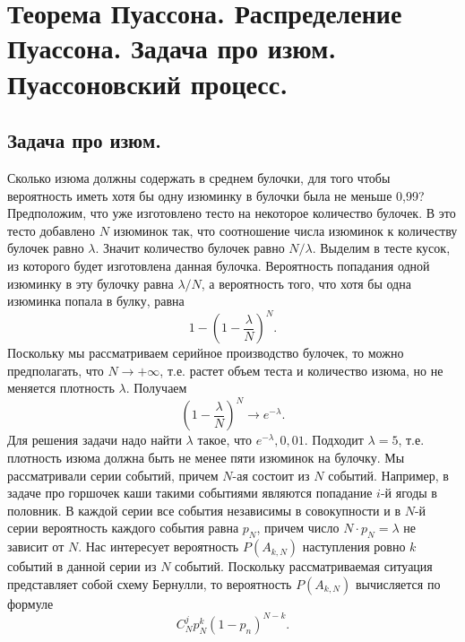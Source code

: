 \section{Теорема Пуассона. Распределение Пуассона. Задача про изюм. Пуассоновский процесс.}

\subsection{Задача про изюм.}
Сколько изюма должны содержать в среднем булочки, для того чтобы вероятность иметь хотя бы одну изюминку в булочки была не меньше 0,99?
\newline
Предположим, что уже изготовлено тесто на некоторое количество булочек. В это тесто добавлено $N$ изюминок так, что соотношение числа изюминок к количеству булочек равно $\lambda$. Значит количество булочек равно $N/\lambda$.
\newline
Выделим в тесте кусок, из которого будет изготовлена данная булочка. Вероятность попадания одной изюминку в эту булочку равна $\lambda / N$, а вероятность того, что хотя бы одна изюминка попала в булку, равна
\[
    1 - \left(
        1 - \frac{\lambda}{N}
    \right)^N.
\]
Поскольку мы рассматриваем серийное производство булочек, то можно предполагать, что $N \to +\infty$, т.е. растет объем теста и количество изюма, но не меняется плотность $\lambda$. Получаем
\[
    \left(
        1  - \frac{\lambda}{N}
    \right)^{N} \to e^{-\lambda}.
\]
Для решения задачи надо найти $\lambda$ такое, что $e^{-\lambda} , 0,01$. Подходит $\lambda = 5$, т.е. плотность изюма должна быть не менее пяти изюминок на булочку.
\newline
Мы рассматривали серии событий, причем $N$-ая состоит из $N$ событий. Например, в задаче про горшочек каши такими событиями являются попадание $i$-й ягоды в половник. В каждой серии все события независимы в совокупности и в $N$-й серии вероятность каждого события равна $p_N$, причем число $N \cdot p_N = \lambda$ не зависит от $N$. Нас интересует вероятность $P(A_{k, N})$ наступления ровно $k$ событий в данной серии из $N$ событий. Поскольку рассматриваемая ситуация представляет собой схему Бернулли, то вероятность $P(A_{k, N})$ вычисляется по формуле $$C_N^j p_N^k (1 - p_n)^{N-k}.$$

